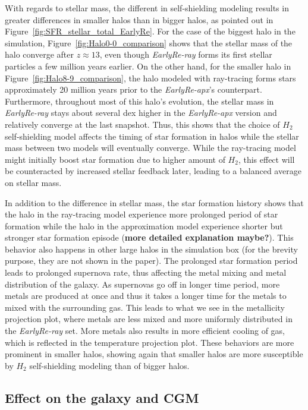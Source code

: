 \documentclass[linenumbers, twocolumn]{aastex631}
\begin{document}
With regards to stellar mass, the different in self-shielding modeling results in greater differences in smaller halos than in bigger halos, as pointed out in Figure~\ref{fig:SFR_stellar_total_EarlyRe}. For the case of the biggest halo in the simulation, Figure~\ref{fig:Halo0-0_comparison} shows that the stellar mass of the halo converge after $z \approx 13$, even though \textit{EarlyRe-ray} forms its first stellar particles a few million years earlier. On the other hand, for the smaller halo in Figure~\ref{fig:Halo8-9_comparison}, the halo modeled with ray-tracing forms stars approximately 20 million years prior to the \textit{EarlyRe-apx}'s counterpart. Furthermore, throughout most of this halo's evolution, the stellar mass in \textit{EarlyRe-ray} stays about several dex higher in the \textit{EarlyRe-apx} version and relatively converge at the last snapshot. Thus, this shows that the choice of $H_{2}$ self-shielding model affects the timing of star formation in halos while the stellar mass between two models will eventually converge. While the ray-tracing model might initially boost star formation due to higher amount of $H_{2}$, this effect will be counteracted by increased stellar feedback later, leading to a balanced average on stellar mass.  

In addition to the difference in stellar mass, the star formation history shows that the halo in the ray-tracing model experience more prolonged period of star formation while the halo in the approximation model experience shorter but stronger star formation episode (\textbf{more detailed explanation maybe?}). This behavior also happens in other large halos in the simulation box (for the brevity purpose, they are not shown in the paper). The prolonged star formation period leads to prolonged supernova rate, thus affecting the metal mixing and metal distribution of the galaxy. As supernovas go off in longer time period, more metals are produced at once and thus it takes a longer time for the metals to mixed with the surrounding gas. This leads to what we see in the metallicity projection plot, where metals are less mixed and more uniformly distributed in the \textit{EarlyRe-ray} set. More metals also results in more efficient cooling of gas, which is reflected in the temperature projection plot. These behaviors are more prominent in smaller halos, showing again that smaller halos are more susceptible by $H_{2}$ self-shielding modeling than of bigger halos. 

\subsection{Effect on the galaxy and CGM}
\label{subsect:ISM_CGM}
\end{document}
